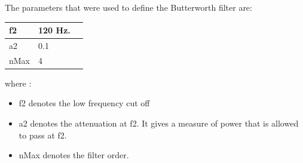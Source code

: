 The parameters that were used to define the Butterworth filter are:

\begin{tabular}{|l|l|r|} \hline
  f2  & 120 Hz. \\ \hline
  a2  & 0.1     \\ \hline
  nMax  & 4     \\ \hline
\end{tabular} \label{tab:butter}

where :
\begin{itemize}
  \item f2 denotes the low frequency cut off 
  \item a2 denotes the attenuation at f2. It gives a measure of power
    that is allowed to pass at f2.
  \item nMax denotes the filter order.
\end{itemize}

